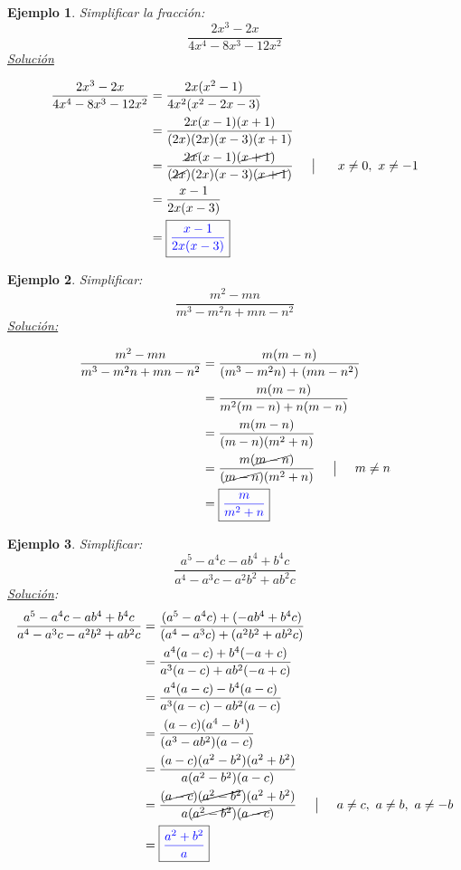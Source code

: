 \documentclass[A4paper, 10pt, oneside]{book}
\newtheorem{example}{Ejemplo}[chapter]
\begin{document}
		\begin{example}
			Simplificar la fracción: $$\frac{2x^3-2x}{4x^4-8x^3-12x^2}$$
			\underline{Solución}
			
			\begin{align*}
				\frac{2x^3-2x}{4x^4-8x^3-12x^2} & = \frac{2x(x^2-1)}{4x^2(x^2-2x-3)}\\
				& = \frac{2x(x-1)(x+1)}{(2x)(2x)(x-3)(x+1)}\\
				&=\frac{\cancel{2x}(x-1)(\cancel{x+1})}{(\cancel{2x})(2x)(x-3)(\cancel{x+1})} \hspace{5mm} \big| \ \hspace{5mm} x\neq 0, \ x\neq -1\\
				&= \frac{x-1}{2x(x-3)}\\
				&= \fbox{\color{blue}{$\displaystyle{\frac{x-1}{2x(x-3)}}$}}
			\end{align*}
		\end{example}
	
		\begin{example}
			Simplificar: $$\frac{m^2-mn}{m^3-m^2n+mn-n^2}$$
			\underline{Solución:}
			
			\begin{align*}
				\frac{m^2-mn}{m^3-m^2n+mn-n^2} &= \frac{m(m-n)}{(m^3-m^2n)+(mn-n^2)}\\
				&=\frac{m(m-n)}{m^2(m-n)+n(m-n)}\\
				&=\frac{m(m-n)}{(m-n)(m^2+n)}\\
				&=\frac{m(\cancel{m-n})}{(\cancel{m-n})(m^2+n)} \hspace{5mm} \big| \hspace{5mm} m\neq n\\
				&= \fbox{\color{blue}{$\displaystyle{\frac{m}{m^2+n}}$}}
			\end{align*}
		\end{example}
	
		\begin{example}
			Simplificar: $$\frac{a^5-a^4c-ab^4+b^4c}{a^4-a^3c-a^2b^2+ab^2c}$$
			\underline{Solución}:
			\begin{align*}
				\frac{a^5-a^4c-ab^4+b^4c}{a^4-a^3c-a^2b^2+ab^2c} &= \frac{(a^5-a^4c)+(-ab^4+b^4c)}{(a^4-a^3c)+(a^2b^2+ab^2c)}\\
				&=\frac{a^4(a-c)+b^4(-a+c)}{a^3(a-c)+ab^2(-a+c)}\\
				&=\frac{a^4(a-c)-b^4(a-c)}{a^3(a-c)-ab^2(a-c)}\\
				&=\frac{(a-c)(a^4-b^4)}{(a^3-ab^2)(a-c)}\\
				&=\frac{(a-c)(a^2-b^2)(a^2+b^2)}{a(a^2-b^2)(a-c)}\\
				&=\frac{(\cancel{a-c})(\cancel{a^2-b^2})(a^2+b^2)}{a(\cancel{a^2-b^2})(\cancel{a-c})} \hspace{5mm} \big| \hspace{5mm} a\neq c, \ a\neq b, \ a\neq -b\\
				&=\fbox{\color{blue}{$\displaystyle{\frac{a^2+b^2}{a}}$}}
			\end{align*}
		\end{example}
	
\end{document}
